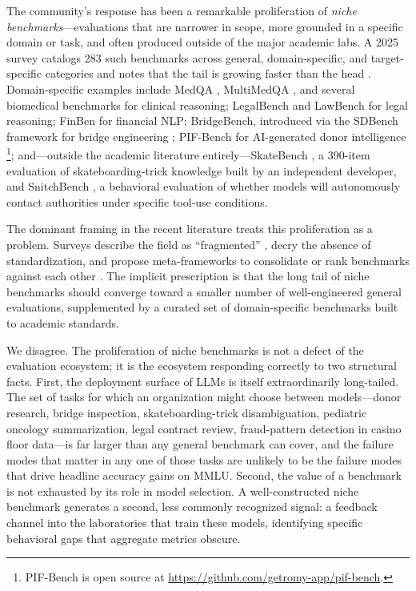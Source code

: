 \documentclass[11pt,a4paper]{article}
\begin{document}
The community's response has been a remarkable proliferation of \emph{niche benchmarks}---evaluations that are narrower in scope, more grounded in a specific domain or task, and often produced outside of the major academic labs. A 2025 survey catalogs 283 such benchmarks across general, domain-specific, and target-specific categories and notes that the tail is growing faster than the head \citep{liu2025survey}. Domain-specific examples include MedQA \citep{jin2021disease}, MultiMedQA \citep{singhal2023large}, and several biomedical benchmarks for clinical reasoning; LegalBench \citep{guha2024legalbench} and LawBench \citep{fei2023lawbench} for legal reasoning; FinBen \citep{xie2024finben} for financial NLP; BridgeBench, introduced via the SDBench framework for bridge engineering \citep{sdbench2025}; PIF-Bench for AI-generated donor intelligence \citep{lijo2026pifbench}\footnote{PIF-Bench is open source at \url{https://github.com/getromy-app/pif-bench}.}; and---outside the academic literature entirely---SkateBench \citep{browne2025skatebench}, a 390-item evaluation of skateboarding-trick knowledge built by an independent developer, and SnitchBench \citep{browne2025snitchbench}, a behavioral evaluation of whether models will autonomously contact authorities under specific tool-use conditions.

The dominant framing in the recent literature treats this proliferation as a problem. Surveys describe the field as ``fragmented'' \citep{benchmarking_se2025}, decry the absence of standardization, and propose meta-frameworks to consolidate or rank benchmarks against each other \citep{qian2026benchmark2,benchbench2026}. The implicit prescription is that the long tail of niche benchmarks should converge toward a smaller number of well-engineered general evaluations, supplemented by a curated set of domain-specific benchmarks built to academic standards.

We disagree. The proliferation of niche benchmarks is not a defect of the evaluation ecosystem; it is the ecosystem responding correctly to two structural facts. First, the deployment surface of LLMs is itself extraordinarily long-tailed. The set of tasks for which an organization might choose between models---donor research, bridge inspection, skateboarding-trick disambiguation, pediatric oncology summarization, legal contract review, fraud-pattern detection in casino floor data---is far larger than any general benchmark can cover, and the failure modes that matter in any one of those tasks are unlikely to be the failure modes that drive headline accuracy gains on MMLU. Second, the value of a benchmark is not exhausted by its role in model selection. A well-constructed niche benchmark generates a second, less commonly recognized signal: a feedback channel into the laboratories that train these models, identifying specific behavioral gaps that aggregate metrics obscure.
\end{document}
